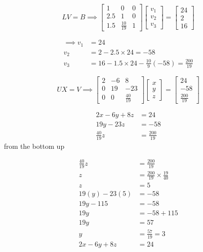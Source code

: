 \documentclass[a4paper, 12pt]{report}
\begin{document}
{\begin{equation*}
LV=B\implies
\begin{bmatrix}
1& 0& 0\\
2.5& 1& 0\\
1.5& \frac{10}{19}& 1
\end{bmatrix}
\begin{bmatrix}
v_1\\ v_2\\ v_3
\end{bmatrix}
=
\begin{bmatrix}
24\\ 2\\ 16
\end{bmatrix}
\end{equation*}

\begin{align*}
\implies v_1&=24\\
v_2&=2-2.5\times 24=-58\\
v_3&=16-1.5\times 24-\frac{10}{9}(-58)=\frac{200}{19}
\end{align*}

\begin{equation*}
UX=V\implies
\begin{bmatrix}
2& -6& 8\\
0& 19& -23\\
0& 0& \frac{40}{19}
\end{bmatrix}
\begin{bmatrix}
x\\ y\\ z
\end{bmatrix}
=
\begin{bmatrix}
24\\ -58\\ \frac{200}{19}
\end{bmatrix}
\end{equation*}

\begin{align*}
2x-6y+8z&=24\\
19y-23z&=-58\\
\frac{40}{19}z&=\frac{200}{19}
\end{align*}
from the bottom up

\begin{align*}
\frac{40}{19}z&=\frac{200}{19}\\
z&=\frac{200}{19}\times \frac{19}{40}\\
z&=5\\
19(y)-23(5)&=-58\\
19y-115&=-58\\
19y&=-58+115\\
19y&=57\\
y&=\frac{57}{19}=3\\
2x-6y+8z&=24\\
\end{align*}

}
\end{document}
